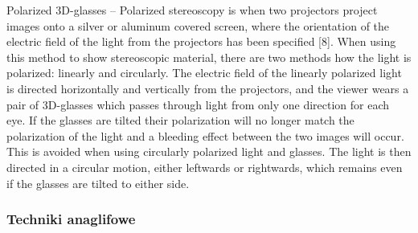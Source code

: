 \begin{itemize}
\itemi Polarized 3D-glasses – Polarized stereoscopy is when two projectors project
images onto a silver or aluminum covered screen, where the orientation of the
electric field of the light from the projectors has been specified [8]. When
using this method to show stereoscopic material, there are two methods how
the light is polarized: linearly and circularly. The electric field of the linearly
polarized light is directed horizontally and vertically from the projectors, and
the viewer wears a pair of 3D-glasses which passes through light from only
one direction for each eye. If the glasses are tilted their polarization will no
longer match the polarization of the light and a bleeding effect between the
two images will occur. This is avoided when using circularly polarized light
and glasses. The light is then directed in a circular motion, either leftwards or
rightwards, which remains even if the glasses are tilted to either side.

\end{itemize}



\subsubsection{Techniki anaglifowe}

\newpage
